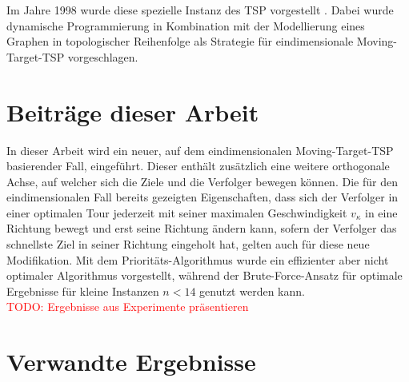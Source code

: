\documentclass[german,version-2019-11]{uzl-thesis}
\begin{document}
Im Jahre 1998 wurde diese spezielle Instanz des TSP vorgestellt \cite{helvig}. Dabei wurde dynamische Programmierung  \cite{kunzi2013einfuhrungskursus} in Kombination mit der Modellierung eines Graphen in topologischer Reihenfolge als Strategie für eindimensionale Moving-Target-TSP vorgeschlagen.

\section{Beiträge dieser Arbeit}

In dieser Arbeit wird ein neuer, auf dem eindimensionalen Moving-Target-TSP basierender Fall, eingeführt. Dieser enthält zusätzlich eine weitere orthogonale Achse, auf welcher sich die Ziele und die Verfolger bewegen können. Die für den eindimensionalen Fall bereits gezeigten Eigenschaften, dass sich der Verfolger in einer optimalen Tour jederzeit mit seiner maximalen Geschwindigkeit $v_{\kappa}$ in eine Richtung bewegt und erst seine Richtung ändern kann, sofern der Verfolger das schnellste Ziel in seiner Richtung eingeholt hat, gelten auch für diese neue Modifikation. Mit dem Prioritäts-Algorithmus wurde ein effizienter aber nicht optimaler Algorithmus vorgestellt, während der Brute-Force-Ansatz für optimale Ergebnisse für kleine Instanzen $n<14$ genutzt werden kann. \\
\textcolor{red}{TODO: Ergebnisse aus Experimente präsentieren}


\section{Verwandte Ergebnisse}
\end{document}
